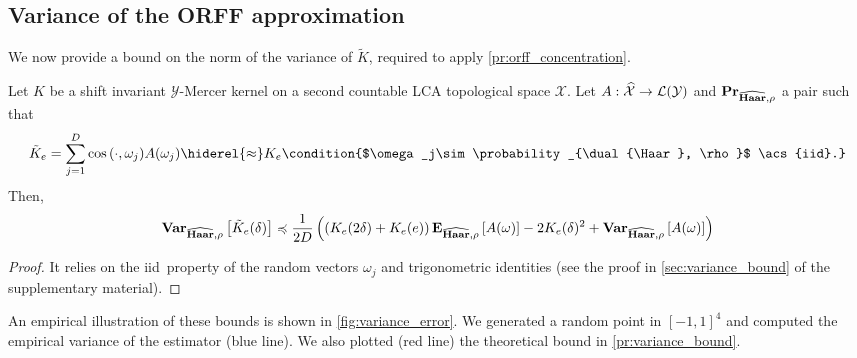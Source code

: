 \subsection{Variance of the ORFF approximation}
We now provide a bound on the norm of the variance of $\tilde{K}$, required to apply \cref{pr:orff_concentration}.
\begin{proposition}
    Let $K$ be a shift invariant $\mathcal{Y}$-Mercer
    kernel on a second countable \ac{LCA} topological space $\mathcal{X}$. Let
    $A:\widehat{\mathcal{X}}\to\mathcal{L}(\mathcal{Y})$ and
    ${\mathbf{{Pr}}}_{\widehat{\mathbf{Haar}},\rho}$ a pair such that
    \begin{dmath*}
        \tilde{K}_e = \sum_{j=1}^D \cos{\pairing{\cdot,\omega_j}}A (\omega_j)
        \hiderel{\approx}
        K_e\condition{$\omega_j\sim\probability_{\dual{\Haar}, \rho}$
        \acs{iid}.}
    \end{dmath*}
    Then,
    \begin{dmath*}
        \variance_{\dual{\Haar}, \rho} \left[ \tilde{K}_e(\delta) \right]
        \preccurlyeq \frac{1}{2D} \left( \left( K_e(2\delta) + K_e(e) \right)
        \expectation_{\dual{\Haar}, \rho}\left[ A(\omega) \right] -
        2 K_e(\delta)^2 + \variance_{\dual{\Haar}, \rho}\left[
        A(\omega) \right]\right)
    \end{dmath*}
\end{proposition}
\begin{proof}
    It relies on the \ac{iid}~property of the random vectors $\omega_j$ and
    trigonometric identities (see the proof in \cref{sec:variance_bound} of the
    supplementary material).
\end{proof}
An empirical illustration of these bounds is shown in \cref{fig:variance_error}. We generated a random point in $[-1,1]^4$ and computed the empirical variance of the estimator (blue line). We also plotted (red line) the theoretical bound in \cref{pr:variance_bound}.
